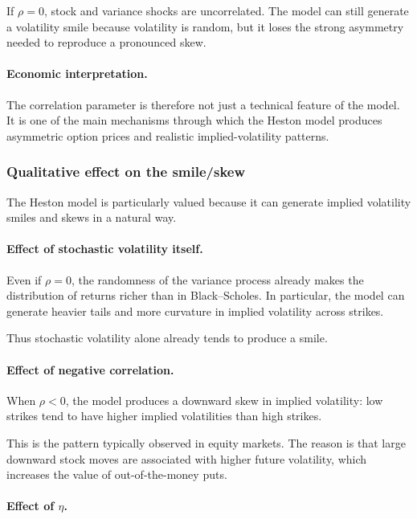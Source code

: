 \documentclass[11pt]{article}
\theoremstyle{plain}
\theoremstyle{definition}
\theoremstyle{remark}
\begin{document}
If \(\rho=0\), stock and variance shocks are uncorrelated.
The model can still generate a volatility smile because volatility is
random, but it loses the strong asymmetry needed to reproduce a
pronounced skew.

\paragraph{Economic interpretation.}

The correlation parameter is therefore not just a technical feature of
the model.
It is one of the main mechanisms through which the Heston model produces
asymmetric option prices and realistic implied-volatility patterns.

\subsubsection{Qualitative effect on the smile/skew}

The Heston model is particularly valued because it can generate implied
volatility smiles and skews in a natural way.

\paragraph{Effect of stochastic volatility itself.}

Even if \(\rho=0\), the randomness of the variance process already makes
the distribution of returns richer than in Black--Scholes.
In particular, the model can generate heavier tails and more curvature
in implied volatility across strikes.

Thus stochastic volatility alone already tends to produce a smile.

\paragraph{Effect of negative correlation.}

When \(\rho<0\), the model produces a downward skew in implied
volatility:
low strikes tend to have higher implied volatilities than high strikes.

This is the pattern typically observed in equity markets.
The reason is that large downward stock moves are associated with higher
future volatility, which increases the value of out-of-the-money puts.

\paragraph{Effect of \(\eta\).}
\end{document}
